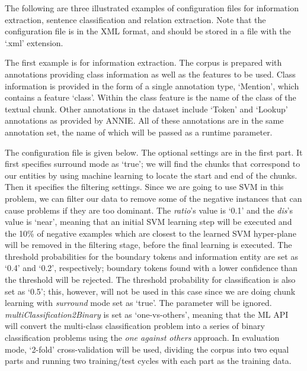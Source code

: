 
The following are three illustrated examples of configuration files for
information extraction, sentence classification and relation extraction. Note
that the configuration file is in the XML format, and should be stored in a file
with the `.xml' extension.


The first example is for information extraction. The corpus is prepared with
annotations providing class information as well as the features to be used.
Class information is provided in the form of a single annotation type,
`Mention', which contains a feature `class'. Within the class feature is
the name of the class of the textual chunk. Other annotations in the dataset
include `Token' and `Lookup' annotations as provided by ANNIE. All of these
annotations are in the same annotation set, the name of which will be passed as
a runtime parameter.

The configuration file is given below. The optional settings are in the first
part. It first specifies surround mode as `true'; we will find the chunks that
correspond to our entities by using machine learning to locate the start and end
of the chunks. Then it specifies the filtering settings. Since we are going to
use SVM in this problem, we can filter our data to remove some of the negative
instances that can cause problems if they are too dominant. The {\em ratio}'s
value is `0.1' and the {\em dis}'s value is `near', meaning that an initial
SVM learning step will be executed and the 10\% of negative examples which are
closest to the learned SVM hyper-plane will be removed in the filtering stage,
before the final learning is executed. The threshold probabilities for the
boundary tokens and information entity are set as `0.4' and `0.2',
respectively; boundary tokens found with a lower confidence than the threshold
will be rejected. The threshold probability for classification is also set as
`0.5'; this, however, will not be used in this case since we are doing chunk
learning with {\em surround} mode set as `true'. The parameter will be ignored.
{\em multiClassification2Binary} is set as `one-vs-others', meaning that the ML
API will convert the multi-class classification problem into a series of binary
classification problems using the {\em one against others} approach. In
evaluation mode, `2-fold' cross-validation will be used, dividing the corpus
into two equal parts and running two training/test cycles with each part as the
training data.

